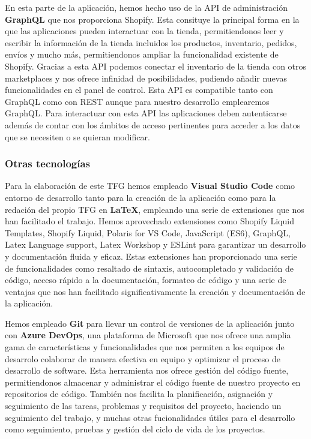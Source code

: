\documentclass[12pt]{article}
\begin{document}
En esta parte de la aplicación, hemos hecho uso de la API de administración \textbf{GraphQL} que nos proporciona Shopify. Esta consituye la principal forma en la que 
las aplicaciones pueden interactuar con la tienda, permitiendonos leer y escribir la información de la tienda incluidos los productos, inventario, pedidos,
envíos y mucho más, permitiendonos ampliar la funcionalidad existente de Shopify. Gracias a esta API podemos conectar el inventario
de la tienda con otros marketplaces y nos ofrece infinidad de posibilidades, pudiendo añadir nuevas funcionalidades en el panel de control.
Esta API es compatible tanto con GraphQL como con REST aunque para nuestro desarrollo emplearemos GraphQL. Para interactuar con esta API las aplicaciones
deben autenticarse además de contar con los ámbitos de acceso pertinentes para acceder a los datos que se necesiten o se quieran modificar. \cite{shopify-dev}


\subsubsection{Otras tecnologías}
Para la elaboración de este TFG hemos empleado \textbf{Visual Studio Code} como entorno de desarrollo tanto para la creación de la aplicación como para
la redación del propio TFG en \textbf{LaTeX}, empleando una serie de extensiones que nos han facilitado el trabajo. 
Hemos aprovechado extensiones como Shopify Liquid Templates, Shopify Liquid, 
Polaris for VS Code, JavaScript (ES6), GraphQL, Latex Language support, Latex Workshop y ESLint para garantizar un desarrollo y documentación
fluida y eficaz. Estas extensiones han proporcionado una serie de funcionalidades como resaltado de sintaxis, autocompletado y validación de código, 
acceso rápido a la documentación, formateo de código y una serie de ventajas que nos han facilitado significativamente la creación y documentación de la aplicación.

Hemos empleado \textbf{Git} para llevar un control de versiones de la aplicación junto con \textbf{Azure DevOps}, una plataforma de Microsoft que nos ofrece una amplia
gama de características y funcionalidades que nos permiten a los equipos de desarrolo colaborar de manera efectiva en equipo y optimizar el proceso de desarrollo
de software. Esta herramienta nos ofrece gestión del código fuente, permitiendonos almacenar y administrar el código fuente de nuestro proyecto en 
repositorios de código. También nos facilita la planificación, asignación y seguimiento de las tareas, problemas y requisitos del proyecto, haciendo
un seguimiento del trabajo, y muchas otras fucionalidades útiles para el desarrollo como seguimiento, pruebas y gestión del ciclo de vida de los proyectos. \cite{devOps}
\end{document}

